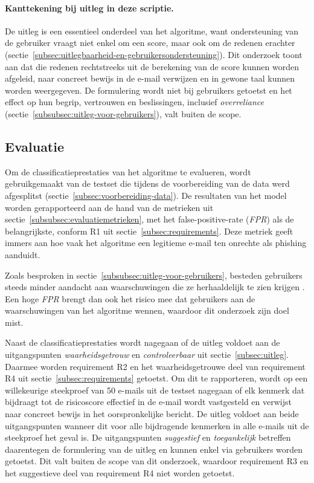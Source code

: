 \paragraph{Kanttekening bij uitleg in deze scriptie.}
De uitleg is een essentieel onderdeel van het algoritme, want ondersteuning van de gebruiker vraagt niet enkel om een score, maar ook om de redenen erachter (sectie~\ref{subsec:uitlegbaarheid-en-gebruikersondersteuning}). Dit onderzoek toont aan dat die redenen rechtstreeks uit de berekening van de score kunnen worden afgeleid, naar concreet bewijs in de e-mail verwijzen en in gewone taal kunnen worden weergegeven. De formulering wordt niet bij gebruikers getoetst en het effect op hun begrip, vertrouwen en beslissingen, inclusief \emph{overreliance} (sectie~\ref{subsubsec:uitleg-voor-gebruikers}), valt buiten de scope.

\subsection{Evaluatie}
\label{sec:evaluatie}

Om de classificatieprestaties van het algoritme te evalueren, wordt gebruikgemaakt van de testset die tijdens de voorbereiding van de data werd afgesplitst (sectie~\ref{subsec:voorbereiding-data}). De resultaten van het model worden gerapporteerd aan de hand van de metrieken uit sectie~\ref{subsubsec:evaluatiemetrieken}, met het false-positive-rate (\emph{FPR}) als de belangrijkste, conform R1 uit sectie~\ref{subsec:requirements}. Deze metriek geeft immers aan hoe vaak het algoritme een legitieme e-mail ten onrechte als phishing aanduidt. 

Zoals besproken in sectie~\ref{subsubsec:uitleg-voor-gebruikers}, besteden gebruikers steeds minder aandacht aan waarschuwingen die ze herhaaldelijk te zien krijgen \autocite{Anderson2015}. Een hoge \emph{FPR} brengt dan ook het risico mee dat gebruikers aan de waarschuwingen van het algoritme wennen, waardoor dit onderzoek zijn doel mist. 

Naast de classificatieprestaties wordt nagegaan of de uitleg voldoet aan de uitgangspunten \emph{waarheidsgetrouw} en \emph{controleerbaar} uit sectie~\ref{subsec:uitleg}. Daarmee worden requirement R2 en het waarheidsgetrouwe deel van requirement R4 uit sectie~\ref{subsec:requirements} getoetst. 
Om dit te rapporteren, wordt op een willekeurige steekproef van 50 e-mails uit de testset nagegaan of elk kenmerk dat bijdraagt tot de risicoscore effectief in de e-mail wordt vastgesteld en verwijst naar concreet bewijs in het oorspronkelijke bericht. De uitleg voldoet aan beide uitgangspunten wanneer dit voor alle bijdragende kenmerken in alle e-mails uit de steekproef het geval is. De uitgangspunten \emph{suggestief} en \emph{toegankelijk} betreffen daarentegen de formulering van de uitleg en kunnen enkel via gebruikers worden getoetst. Dit valt buiten de scope van dit onderzoek, waardoor requirement R3 en het suggestieve deel van requirement R4 niet worden getoetst.